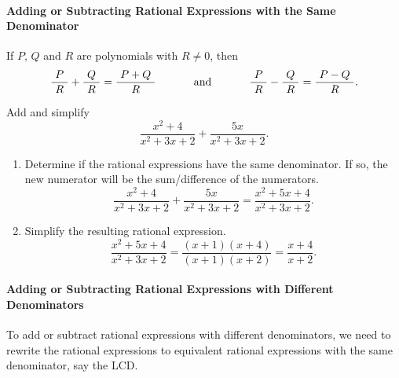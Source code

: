 
\paragraph*{Adding or Subtracting Rational Expressions with the Same Denominator}
		If $P$, $Q$ and $R$ are polynomials with $R\neq 0$, then
	\[
		\dfrac{~P~}{~R~}+\dfrac{~Q~}{~R~}=\dfrac{~P+Q~}{~R~}\hspace{0.1\textwidth} \textup{and} \hspace{0.1\textwidth}
		\dfrac{~P~}{~R~}-\dfrac{~Q~}{~R~}=\dfrac{~P-Q~}{~R~}.
	\]
	\vspace*{0.1\baselineskip}
	\begin{example}
		Add and simplify 
		$$
		\dfrac{x^2+4}{x^2+3x+2}+\dfrac{5x}{x^2+3x+2}.
		$$
	\end{example}
\vspace*{-1.1\baselineskip}
	\begin{solution}
		\begin{enumerate}[label={\textbf{\textup{Step \arabic*.}}~}]
			\item Determine if the rational expressions have the same denominator. If so, the new numerator will be the sum/difference of the numerators.
			      \[
				      \dfrac{x^2+4}{x^2+3x+2}+\dfrac{5x}{x^2+3x+2}=\dfrac{x^2+5x+4}{x^2+3x+2}.
			      \]
			\item Simplify the resulting rational expression.
			      \[
				      \dfrac{x^2+5x+4}{x^2+3x+2}=\dfrac{(x+1)(x+4)}{(x+1)(x+2)}=\dfrac{x+4}{x+2}.
			      \]
		\end{enumerate}
	\end{solution}







\paragraph*{Adding or Subtracting Rational Expressions with Different Denominators}
	To add or subtract rational expressions with different denominators, we need to rewrite the rational expressions to equivalent rational expressions with the same denominator, say the LCD.

